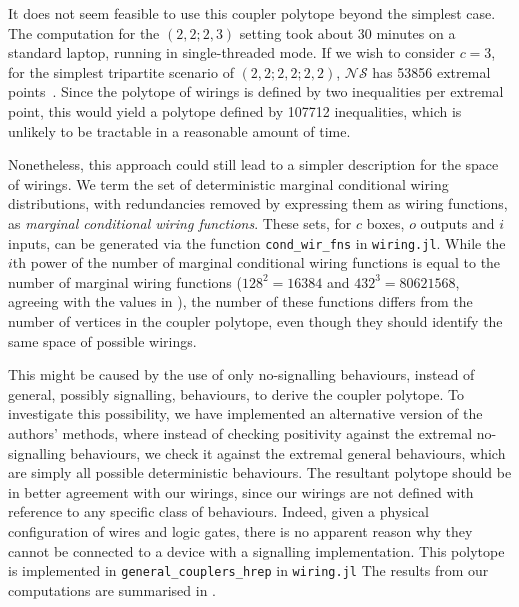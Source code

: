 \documentclass[10pt, a4paper]{article}
\numberwithin{equation}{section} %
\theoremstyle{definition}
\theoremstyle{plain}
\newcommand{\?}{\mathrel{?}} %
\newcommand{\NSs}{\mathcal{NS}}
\begin{document}
                  It does not seem feasible to use this coupler polytope beyond the simplest case. The computation for the \((2,2;2,3)\) setting took about 30 minutes on a standard laptop, running in single-threaded mode. If we wish to consider \(c=3\), for the simplest tripartite scenario of \((2,2; 2,2; 2,2)\), \(\NSs\) has 53856 extremal points~\cite{Tripartite}. Since the polytope of wirings is defined by two inequalities per extremal point, this would yield a polytope defined by 107712 inequalities, which is unlikely to be tractable in a reasonable amount of time.


                  Nonetheless, this approach could still lead to a simpler description for the space of wirings. We term the set of deterministic marginal conditional wiring distributions, with redundancies removed by expressing them as wiring functions, as \emph{marginal conditional wiring functions}. These sets, for \(c\) boxes, \(o\) outputs and \(i\) inputs, can be generated via the function \verb`cond_wir_fns` in \verb`wiring.jl`. While the \(i\)th power of the number of marginal conditional wiring functions is equal to the number of marginal wiring functions (\(128^2 = 16384\) and \(432^3 = 80621568\), agreeing with the values in ), the number of these functions differs from the number of vertices in the coupler polytope, even though they should identify the same space of possible wirings.

                  This might be caused by the use of only no-signalling behaviours, instead of general, possibly signalling, behaviours, to derive the coupler polytope. To investigate this possibility, we have implemented an alternative version of the authors' methods, where instead of checking positivity against the extremal no-signalling behaviours, we check it against the extremal general behaviours, which are simply all possible deterministic behaviours. The resultant polytope should be in better agreement with our wirings, since our wirings are not defined with reference to any specific class of behaviours. Indeed, given a physical configuration of wires and logic gates, there is no apparent reason why they cannot be connected to a device with a signalling implementation. This polytope is implemented in \verb`general_couplers_hrep` in \verb`wiring.jl` The results from our computations are summarised in .
\end{document}
